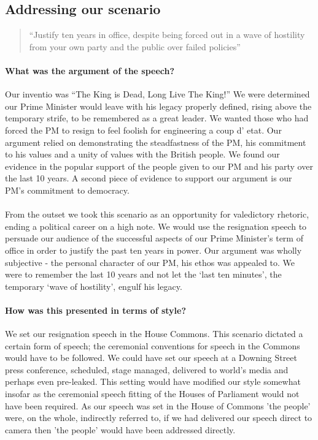 \documentclass[12pt]{article}
\begin{document}
\begin{doublespace}
\section{Addressing our scenario}
\begin{quote}
``Justify ten years in office, despite being forced out in a wave of hostility from your own party and the public over failed policies''
\end{quote}
\paragraph{What was the argument of the speech?}
Our inventio was ``The King is Dead, Long Live The King!'' We were determined our Prime Minister would leave with his legacy properly defined, rising above the temporary strife, to be remembered as a great leader. We wanted those who had forced the PM to resign to feel foolish for engineering a coup d' etat. Our argument relied on demonstrating the steadfastness of the PM, his commitment to his values and a unity of values with the British people. We found our evidence in the popular support of the people given to our PM and his party over the last 10 years. A second piece of evidence to support our argument is our PM's commitment to democracy.

\paragraph{}From the outset we took this scenario as an opportunity for valedictory rhetoric, ending a political career on a high note. We would use the resignation speech to persuade our audience of the successful aspects of our Prime Minister's term of office in order to justify the past ten years in power. Our argument was wholly subjective - the personal character of our PM, his ethos was appealed to. We were to remember the last 10 years and not let the `last ten minutes', the temporary `wave of hostility', engulf his legacy.

\paragraph{How was this presented in terms of style?}We set our resignation speech in the House Commons. This scenario dictated a certain form of speech; the ceremonial conventions for speech in the Commons would have to be followed. We could have set our speech at a Downing Street press conference, scheduled, stage managed, delivered to world's media and perhaps even pre-leaked. This setting would have modified our style somewhat insofar as the ceremonial speech fitting of the Houses of Parliament would not have been required. As our speech was set in the House of Commons 'the people' were, on the whole, indirectly referred to, if we had delivered our speech direct to camera then 'the people' would have been addressed directly.


\end{doublespace}
\end{document}
